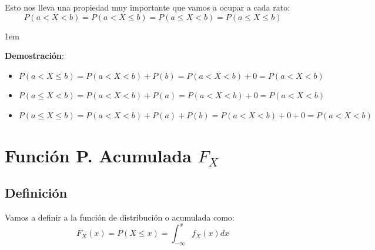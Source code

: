 \documentclass[12pt, fleqn]{report}                             %
\newenvironment{SmallIndentation}[1][0.75em]                    %
        {\begin{adjustwidth}{#1}{}\begin{footnotesize}}             %
        {\end{footnotesize}\end{adjustwidth}}                       %
\theoremstyle{break}                                            %
\begin{document}
                Esto nos lleva una propiedad muy importante que vamos a ocupar a cada rato:
                \begin{equation*}
                    P(a < X < b) = P(a < X \leq b) = P(a \leq X < b) = P(a \leq X \leq b)
                \end{equation*}

                    
                \begin{SmallIndentation}[1em]

                    \textbf{Demostración}:

                    \begin{itemize}
                        \item $P(a < X \leq b)    = P(a < X < b) + P(b) = P(a < X < b) + 0 = P(a < X < b)$
                        \item $P(a \leq X < b)    = P(a < X < b) + P(a) = P(a < X < b) + 0 = P(a < X < b)$
                        \item $P(a \leq X \leq b) = P(a < X < b) + P(a) + P(b) = P(a < X < b) + 0 + 0 = P(a < X < b)$
                    \end{itemize}
                \end{SmallIndentation}




        \clearpage
        \section{Función P. Acumulada $F_X$}

            \subsection{Definición}

                Vamos a definir a la función de distribución o acumulada como:
                \begin{equation*}
                    F_X(x) = P(X \leq x) = \int_{-\infty}^x f_X(x) dx
                \end{equation*}
\end{document}
